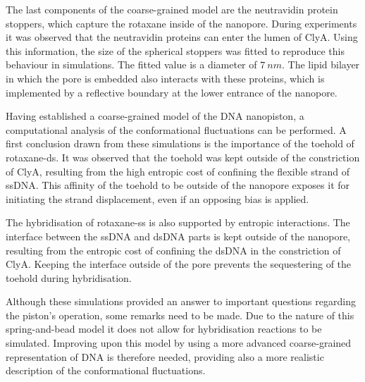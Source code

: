 The last components of the coarse-grained model are the neutravidin protein stoppers,
which capture the rotaxane inside of the nanopore. During experiments it was observed
that the neutravidin proteins can enter the lumen of ClyA. Using this information, the
size of the spherical stoppers was fitted to reproduce this behaviour in simulations.
The fitted value is a diameter of $7\ nm$. The lipid bilayer in which the pore is
embedded also interacts with these proteins, which is implemented by a reflective
boundary at the lower entrance of the nanopore.

Having established a coarse-grained model of the DNA nanopiston, a computational analysis
of the conformational fluctuations can be performed. A first conclusion drawn from these
simulations is the importance of the toehold of rotaxane-ds. It was observed
that the toehold was kept outside of the constriction of ClyA, resulting from the high
entropic cost of confining the flexible strand of ssDNA. This affinity of the toehold to
be outside of the nanopore exposes it for initiating the strand displacement, even if an
opposing bias is applied.

The hybridisation of rotaxane-ss is also supported by entropic interactions. The
interface between the ssDNA and dsDNA parts is kept outside of the nanopore, resulting
from the entropic cost of confining the dsDNA in the constriction of ClyA. Keeping the
interface outside of the pore prevents the sequestering of the toehold during
hybridisation.

Although these simulations provided an answer to important questions regarding the
piston's operation, some remarks need to be made. Due to the nature of this
spring-and-bead model it does not allow for hybridisation reactions to be simulated.
Improving upon this model by using a more advanced coarse-grained representation of DNA
is therefore needed, providing also a more realistic description of the conformational
fluctuations. \newline



